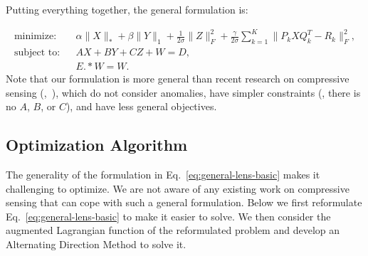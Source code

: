 Putting everything together, the general formulation is:

{\small
\begin{eqnarray}
\text{minimize:}  && \alpha \|X\|_* + \beta \|Y\|_1 +
\frac{1}{2\sigma}\|Z\|_F^2 +\frac{\gamma}{2\sigma}\sum_{k=1}^K\|P_k X Q_k^T - R_k\|_F^2, \nonumber\\
\text{subject to:}&& AX + BY + CZ + W = D, \nonumber\\
&& E.*W = W.
\label{eq:general-lens-basic}
\end{eqnarray}
}
Note that our formulation is more general than recent research on
compressive sensing
(\eg,~\cite{zhang09sensing,robustPCA,recht08:_nec,recht:_guaran}),
which do not consider anomalies,
have simpler constraints (\eg, there is no
$A$, $B$, or $C$), and have less general objectives.



\subsection{Optimization Algorithm}
\label{ssec:adm}

The generality of the formulation in Eq.~\eqref{eq:general-lens-basic}
makes it challenging to optimize. We are not aware of any
existing work on compressive sensing that can cope with such a general
formulation.  Below we first reformulate
Eq.~\eqref{eq:general-lens-basic} to make it easier to solve.  We then
consider the augmented Lagrangian function of the reformulated problem
and develop an Alternating Direction Method to solve it.


